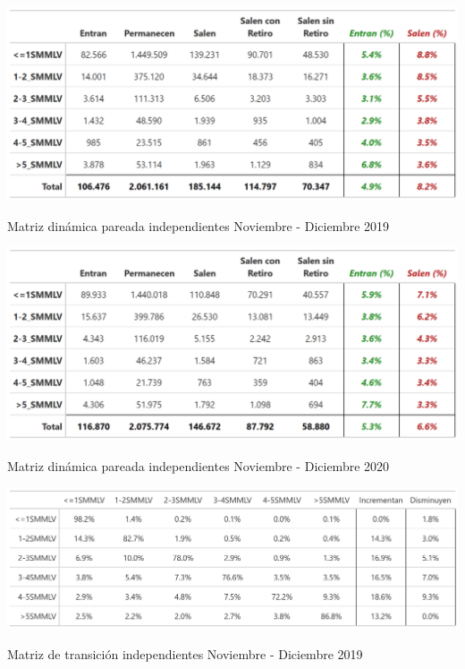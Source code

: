 
\begin{table}[!h]
\label{tabla:sector_privado:matriz_dinamica_mes_12_2019}
\centering
\includegraphics[width = 15cm]{results/02_longitudinal/salida_resumen_independientes_interes_19.png}
\caption{Matriz dinámica pareada independientes Noviembre - Diciembre 2019}%
\end{table}

\begin{table}[!h]
\label{tabla:sector_privado:matriz_dinamica_mes_12_2020}
\centering
\includegraphics[width = 15cm]{results/02_longitudinal/salida_resumen_independientes_interes_20.png}
\caption{Matriz dinámica pareada independientes Noviembre - Diciembre 2020}%
\end{table}

\begin{table}[!h]
\label{tabla:independientes:matrix_transicion_mes_11_12_2019}
\centering
\includegraphics[width = 15cm]{results/02_longitudinal/salida_matriz_transicion_independientes_19.png}
\caption{Matriz de transición independientes Noviembre - Diciembre 2019}%
\end{table}

